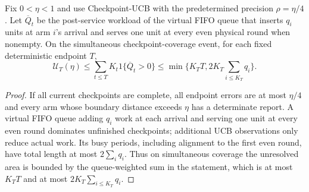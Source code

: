 \begin{lemma}
\label{app:completion_general}
Fix $0<\eta<1$ and use Checkpoint-UCB with the predetermined precision
$\rho=\eta/4$. Let $\overline Q_t$ be the post-service workload of the
virtual FIFO queue that inserts $q_i$ units at arm $i$'s arrival and serves
one unit at every even physical round when nonempty. On the simultaneous
checkpoint-coverage event, for each fixed deterministic endpoint $T$,
\[
 \mathcal U_T(\eta)\le
 \sum_{t\le T}K_t1\{\overline Q_t>0\}
 \le\min\{K_TT,2K_T\sum_{i\le K_T}q_i\}.
\]
\end{lemma}
\begin{proof}
If all current checkpoints are complete, all endpoint errors are at most $\eta/4$ and every arm whose
boundary distance exceeds $\eta$ has a determinate report. A virtual FIFO
queue adding $q_i$ work at each arrival and serving one unit at every even
round dominates unfinished checkpoints; additional UCB observations only
reduce actual work. Its busy periods, including alignment to the first even
round, have total length at most $2\sum_iq_i$. Thus on simultaneous coverage the unresolved area is bounded by the
queue-weighted sum in the statement, which is at most $K_TT$ and at most
$2K_T\sum_{i\le K_T}q_i$.
\end{proof}
